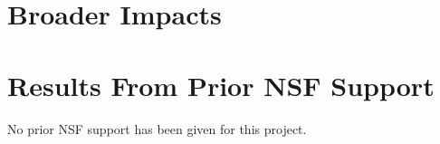 \section{Broader Impacts}

\section{Results From Prior NSF Support}



No prior NSF support has been given for this project.
